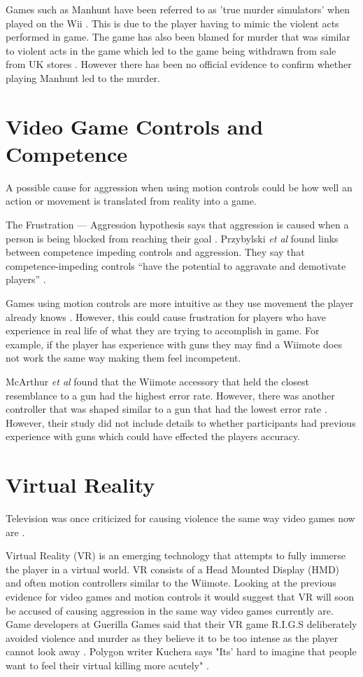 \documentclass{scrartcl}
\begin{document}
Games such as Manhunt have been referred to as 'true murder simulators' when played on the Wii \cite{Manhunt}. This is due to the player having to mimic the violent acts performed in game. 
The game has also been blamed for murder that was similar to violent acts in the game which led to the game being withdrawn from sale from UK stores \cite{Manhunt2Ban, ManhuntMurder}. However there has been no official evidence to confirm whether playing Manhunt led to the murder. 

\section{Video Game Controls and Competence}
A possible cause for aggression when using motion controls could be how well an action or movement is translated from reality into a game.  

The Frustration --- Aggression hypothesis says that aggression is caused when a person is being blocked from reaching their goal \cite{dollard1939frustration}.  Przybylski \textit{et al} found links between competence impeding controls and aggression. They say that competence-impeding controls ``have the potential to aggravate and demotivate players” \cite{przybylski}.

Games using motion controls are more intuitive as they use movement the player already knows \cite{Kim}.   However, this could cause frustration for players who have experience in real life of what they are trying to accomplish in game.  For example, if the player has experience with guns they may find a Wiimote does not work the same way making them feel incompetent.
\bigskip

McArthur \textit{et al} found that the Wiimote accessory that held the closest resemblance to a gun had the highest error rate. However, there was another controller that was shaped similar to a gun that had the lowest error rate \cite{McArthur}.  However, their study did not include details to whether participants had previous experience with guns which could have effected the players accuracy. 

 
\section{Virtual Reality}
Television was once criticized for causing violence the same way video games now are \cite{sherry2001effects}. 

Virtual Reality (VR) is an emerging technology that attempts to fully immerse the player in a virtual world.   VR consists of a Head Mounted Display (HMD) and often motion controllers similar to the Wiimote. 
Looking at the previous evidence for video games and motion controls it would suggest that VR will soon be accused of causing aggression in the same way video games currently are. 
Game developers at Guerilla Games said that their VR game R.I.G.S deliberately avoided violence and murder as they believe it to be too intense as the player cannot look away \cite{VRViolence}. 
Polygon writer Kuchera says "Its' hard to imagine that people want to feel their virtual killing more acutely" \cite{PolygonVR}.  
\end{document}

